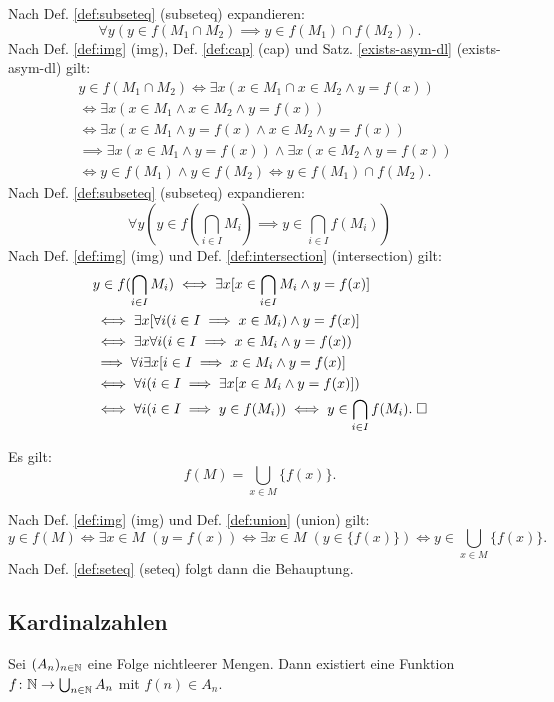 \begin{Beweis}
Nach Def. \ref{def:subseteq} (subseteq) expandieren:
\[\forall y(y\in f(M_1\cap M_2)\implies y\in f(M_1)\cap f(M_2)).\]
Nach Def. \ref{def:img} (img), Def. \ref{def:cap} (cap)
und Satz. \ref{exists-asym-dl} (exists-asym-dl) gilt:
\begin{align*}
& y\in f(M_1\cap M_2) \iff \exists x(x\in M_1\cap x\in M_2\land y=f(x))\\
&\iff \exists x(x\in M_1\land x\in M_2\land y=f(x))\\
&\iff \exists x(x\in M_1\land y=f(x)\land x\in M_2\land y=f(x))\\
&\implies \exists x(x\in M_1\land y=f(x))\land\exists x(x\in M_2\land y=f(x))\\
&\iff y\in f(M_1)\land y\in f(M_2)\iff y\in f(M_1)\cap f(M_2).
\end{align*}
Nach Def. \ref{def:subseteq} (subseteq) expandieren:
\[\forall y(y\in f(\bigcap_{i\in I} M_i)\implies y\in \bigcap_{i\in I} f(M_i))\]
Nach Def. \ref{def:img} (img) und Def. \ref{def:intersection} (intersection)
gilt:
\begin{align*}
& y\in f(\bigcap_{i\in I} M_i)\iff \exists x[x\in\bigcap_{i\in I} M_i\land y=f(x)]\\
& \iff \exists x[\forall i(i\in I\implies x\in M_i)\land y=f(x)]\\
& \iff \exists x\forall i(i\in I\implies x\in M_i\land y=f(x))\\
& \implies \forall i\exists x[i\in I\implies x\in M_i\land y=f(x)]\\
& \iff \forall i(i\in I\implies \exists x[x\in M_i\land y=f(x)])\\
& \iff \forall i(i\in I\implies y\in f(M_i))
\iff y\in\bigcap_{i\in I} f(M_i).\;\square
\end{align*}
\end{Beweis}

\begin{Satz}\label{img-as-cup}
Es gilt:
\[f(M) = \bigcup_{x\in M} \{f(x)\}.\]
\end{Satz}

\begin{Beweis}
Nach Def. \ref{def:img} (img) und Def. \ref{def:union} (union) gilt:
\[y\in f(M) \iff \exists x{\in}M\;(y=f(x))
\iff \exists x{\in}M\;(y\in \{f(x)\})
\iff y\in\bigcup_{x\in M}\{f(x)\}.\]
Nach Def. \ref{def:seteq} (seteq) folgt dann die Behauptung.\,\qedsymbol
\end{Beweis}

\newpage
\subsection{Kardinalzahlen}
\begin{Satz}\label{acc}%
Sei $(A_n)_{n\in\mathbb N}$ eine Folge nichtleerer Mengen.
Dann existiert eine Funktion $f\colon\mathbb N\to\bigcup_{n\in\mathbb N} A_n$
mit $f(n)\in A_n$.
\end{Satz}


